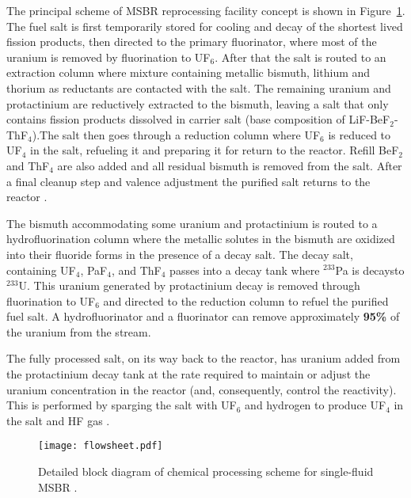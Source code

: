 The principal scheme of \gls{MSBR} reprocessing facility concept is shown in Figure~\ref{fig:material_flow}. The fuel salt is first temporarily stored for cooling and decay of the shortest lived fission products, then directed to the primary fluorinator, where most of the uranium is removed by fluorination to UF$_6$. After that the salt is routed to an extraction column where mixture containing metallic bismuth, lithium and thorium as reductants are contacted with the salt. The remaining uranium and protactinium are reductively extracted to the bismuth, leaving a salt that only contains fission products dissolved in carrier salt (base composition of LiF-BeF$_2$-ThF$_4$).The salt then goes through a reduction column where UF$_6$ is reduced to UF$_4$ in the salt, refueling it and preparing it for return to the reactor. Refill BeF$_2$ and ThF$_4$ are also added and all residual bismuth is removed from the salt. After a final cleanup step and valence adjustment the purified salt returns to the reactor \cite{carter_design_1972,noauthor_one-fluid_nodate}.

The bismuth accommodating some uranium and protactinium is routed to a hydrofluorination column where the metallic solutes in the bismuth are oxidized into their fluoride forms in the presence of a decay salt. The decay salt, containing UF$_4$, PaF$_4$, and ThF$_4$ passes into a decay tank where $^{233}$Pa is decaysto $^{233}$U. This uranium generated by protactinium decay is removed through fluorination to UF$_6$ and directed to the reduction column to refuel the purified fuel salt. A hydrofluorinator and a fluorinator can remove approximately \textbf{95\%} of the uranium from the stream.

The fully processed salt, on its way back to the reactor, has uranium added from the protactinium decay tank at the rate required to maintain or adjust the uranium concentration in the reactor (and, consequently, control the reactivity). This is performed by sparging the salt with UF$_6$ and hydrogen to produce UF$_4$ in the salt and HF gas \cite{robertson_conceptual_1971}.

\begin{figure}[htp!] %
  \centering
  \vspace{-0.3em}
  \texttt{[image: flowsheet.pdf]}
  \caption{Detailed block diagram of chemical processing scheme for single-fluid \gls{MSBR} \cite{robertson_conceptual_1971, noauthor_one-fluid_nodate}.}
  \vspace{-0.6em}
  \label{fig:material_flow}
\end{figure}
\FloatBarrier


